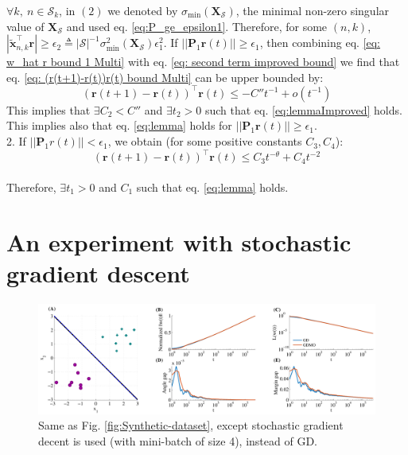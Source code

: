 \documentclass[twoside,11pt,english]{article}
\newcommand{\xtilde}{\tilde{\vect{x}}_{n,k}}
\newcommand{\vect}[1]{\mathbf{#1}}
\begin{document}
$\forall k,\ n\in\mathcal{S}_k$, in $\left(2\right)$ we denoted by $\sigma_{\min}\left(\mathbf{X}_{\mathcal{S}}\right)$,
the minimal non-zero singular value of $\mathbf{X}_{\mathcal{S}}$ and used
eq. \ref{eq:P_ge_epsilon1}. Therefore, for some $(n,k)$, $\left|\xtilde^{\top}\mathbf{r}\right|\geq\epsilon_{2}\triangleq\left|\mathcal{S}\right|^{-1}\sigma_{\min}^{2}\left(\mathbf{X}_{\mathcal{S}}\right)\epsilon_{1}^{2}$.
If $||\mathcal{\vect{P}}_1 \vect{r}(t)||\ge\epsilon_1$, then combining eq. \ref{eq: w_hat r bound 1 Multi} with eq.  \ref{eq: second term improved bound} we find that eq. \ref{eq: (r(t+1)-r(t))r(t) bound Multi} can be upper bounded by:
$$ \left(\vect{r}(t+1)- \vect{r}(t)\right)^\top \vect{r} (t)\le-C''t^{-1}+o(t^{-1})$$
This implies that $\exists C_2<C''$ and $\exists t_2>0$ such that eq. \ref{eq:lemmaImproved} holds. This implies also that eq. \ref{eq:lemma} holds for $||\mathcal{\vect{P}}_1 \vect{r}(t)||\ge\epsilon_1$.\\
2. If $||\mathcal{\vect{P}}_1r(t)||<\epsilon_1$, we obtain (for some positive constants $C_3,C_4$):
$$(\vect{r}(t+1)- \vect{r}(t))^\top \vect{r}(t)\le C_3 t^{-\theta}+C_4t^{-2}$$\\
Therefore, $\exists t_1>0$ and $C_1$ such that eq. \ref{eq:lemma} holds.


\section{An experiment with stochastic gradient descent \label{sec:Additional-Figures}}

\begin{figure}[H]
\begin{centering}
\includegraphics[width=1\columnwidth]{Plots/ToyDataset_SGD} 
\par\end{centering}
\caption{Same as Fig. \ref{fig:Synthetic-dataset}, except stochastic gradient
decent is used (with mini-batch of size 4), instead of GD.\label{fig: SGD} }
\end{figure}
\end{document}
